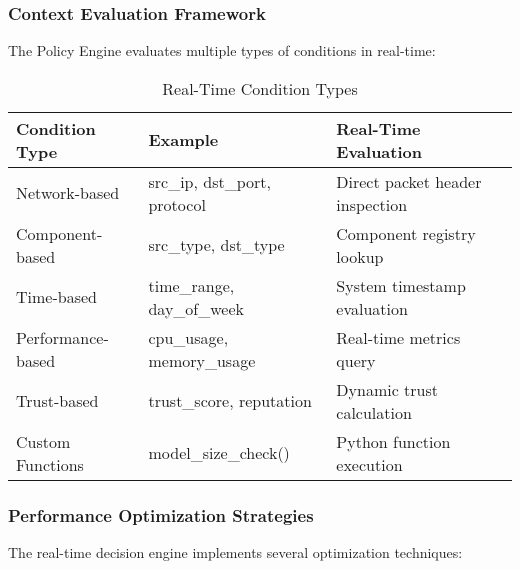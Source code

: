\subsubsection{Context Evaluation Framework}

The Policy Engine evaluates multiple types of conditions in real-time:

\begin{table}[H]
\centering
\caption{Real-Time Condition Types}
\label{tab:condition-types}
\begin{tabular}{@{}llp{6cm}@{}}
\toprule
\textbf{Condition Type} & \textbf{Example} & \textbf{Real-Time Evaluation} \\
\midrule
Network-based & src\_ip, dst\_port, protocol & Direct packet header inspection \\
Component-based & src\_type, dst\_type & Component registry lookup \\
Time-based & time\_range, day\_of\_week & System timestamp evaluation \\
Performance-based & cpu\_usage, memory\_usage & Real-time metrics query \\
Trust-based & trust\_score, reputation & Dynamic trust calculation \\
Custom Functions & model\_size\_check() & Python function execution \\
\bottomrule
\end{tabular}
\end{table}

\subsubsection{Performance Optimization Strategies}

The real-time decision engine implements several optimization techniques:

